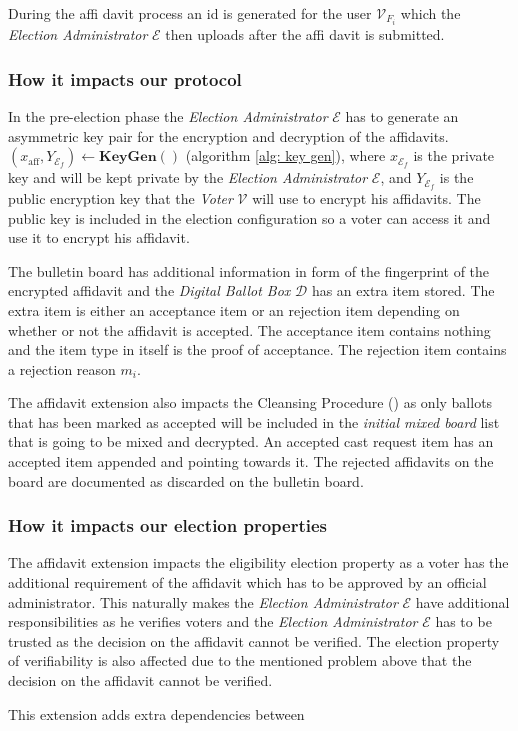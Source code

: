 During the affi davit process an id is generated for the user $\mathcal{V}_{{F}_i}$ which the \textit{Election Administrator} $\mathcal{E}$ then uploads after the affi davit is submitted.


\subsubsection{How it impacts our protocol}
In the pre-election phase the \textit{Election Administrator} $\mathcal{E}$ has to generate an asymmetric key pair for the encryption and decryption of the affidavits. \( (x_\mathrm{aff}, Y_{\mathcal{E}_f}) \leftarrow \mathbf{KeyGen}() \) (algorithm \ref{alg: key gen}), where $x_{\mathcal{E}_f}$ is the private key and will be kept private by the \textit{Election Administrator} $\mathcal{E}$, and $Y_{\mathcal{E}_f}$ is the public encryption key that the \textit{Voter} $\mathcal{V}$ will use to encrypt his affidavits. The public key is included in the election configuration so a voter can access it and use it to encrypt his affidavit.

The bulletin board has additional information in form of the fingerprint of the encrypted affidavit and the \textit{Digital Ballot Box} $\mathcal{D}$ has an extra item stored. The extra item is either an acceptance item or an rejection item depending on whether or not the affidavit is accepted. The acceptance item contains nothing and the item type in itself is the proof of acceptance. The rejection item contains a rejection reason $m_i$. 

The affidavit extension also impacts the Cleansing Procedure () as only ballots that has been marked as accepted will be included in the \textit{initial mixed board} list that is going to be mixed and decrypted. An accepted cast request item has an accepted item appended and pointing towards it. The rejected affidavits on the board are documented as discarded on the bulletin board. 


\subsubsection{How it impacts our election properties}
The affidavit extension impacts the eligibility election property as a voter has the additional requirement of the affidavit which has to be approved by an official administrator. This naturally makes the \textit{Election Administrator} $\mathcal{E}$ have additional responsibilities as he verifies voters and the \textit{Election Administrator} $\mathcal{E}$ has to be trusted as the decision on the affidavit cannot be verified.
The election property of verifiability is also affected due to the mentioned problem above that the decision on the affidavit cannot be verified.

This extension adds extra dependencies between
